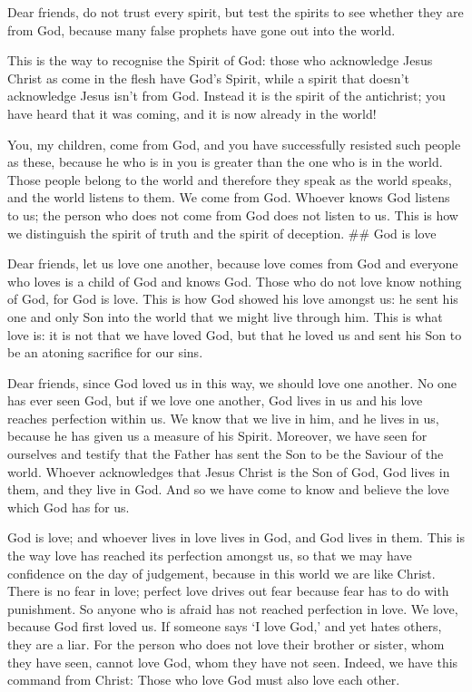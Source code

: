  Dear friends, do not trust every spirit, but test the
spirits to see whether they are from God, because many false prophets
have gone out into the world.

 This is the way to recognise the Spirit of God: those who
acknowledge Jesus Christ as come in the flesh have God's Spirit,
 while a spirit that doesn't acknowledge Jesus isn't from
God. Instead it is the spirit of the antichrist; you have heard that it
was coming, and it is now already in the world!

 You, my children, come from God, and you have successfully
resisted such people as these, because he who is in you is greater than
the one who is in the world.  Those people belong to the
world and therefore they speak as the world speaks, and the world
listens to them.  We come from God. Whoever knows God
listens to us; the person who does not come from God does not listen to
us. This is how we distinguish the spirit of truth and the spirit of
deception. \#\# God is love

 Dear friends, let us love one another, because love comes
from God and everyone who loves is a child of God and knows God.
 Those who do not love know nothing of God, for God is love.
 This is how God showed his love amongst us: he sent his one
and only Son into the world that we might live through him.
 This is what love is: it is not that we have loved God,
but that he loved us and sent his Son to be an atoning sacrifice for our
sins.

 Dear friends, since God loved us in this way, we should
love one another.  No one has ever seen God, but if we love
one another, God lives in us and his love reaches perfection within us.
 We know that we live in him, and he lives in us, because
he has given us a measure of his Spirit.  Moreover, we have
seen for ourselves and testify that the Father has sent the Son to be
the Saviour of the world.  Whoever acknowledges that Jesus
Christ is the Son of God, God lives in them, and they live in God.
 And so we have come to know and believe the love which God
has for us.

God is love; and whoever lives in love lives in God, and God lives in
them.  This is the way love has reached its perfection
amongst us, so that we may have confidence on the day of judgement,
because in this world we are like Christ.  There is no fear
in love; perfect love drives out fear because fear has to do with
punishment. So anyone who is afraid has not reached perfection in love.
 We love, because God first loved us.  If
someone says `I love God,' and yet hates others, they are a liar. For
the person who does not love their brother or sister, whom they have
seen, cannot love God, whom they have not seen.  Indeed, we
have this command from Christ: Those who love God must also love each
other.


